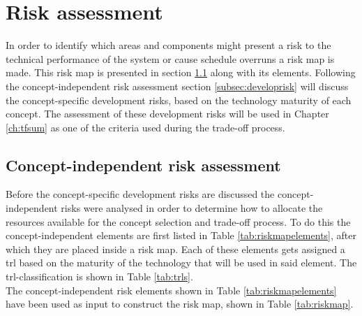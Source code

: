 \section{Risk assessment}
\label{ch:riskestimation}
In order to identify which areas and components might present a risk to the technical performance of the system or cause schedule overruns a risk map is made. This risk map is presented in section \ref{subsec:riskmap} along with its elements. Following the concept-independent risk assessment section \ref{subsec:developrisk} will discuss the concept-specific development risks, based on the technology maturity of each concept. The assessment of these development risks will be used in Chapter \ref{ch:tfsum} as one of the criteria used during the trade-off process.\\

\subsection{Concept-independent risk assessment} \label{subsec:riskmap}
Before the concept-specific development risks are discussed the concept-independent risks were analysed in order to determine how to allocate the resources available for the concept selection and trade-off process. To do this the concept-independent elements are first listed in Table \ref{tab:riskmapelements}, after which they are placed inside a risk map. Each of these elements gets assigned a \acrfull{trl} \cite{NASA2007} based on the maturity of the technology that will be used in said element. The \gls{trl}-classification is shown in Table \ref{tab:trls}.\\

The concept-independent risk elements shown in Table \ref{tab:riskmapelements} have been used as input to construct the risk map, shown in Table \ref{tab:riskmap}.\\

